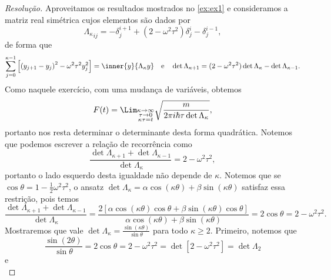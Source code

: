 \begin{proof}[Resolução]
   Aproveitamos os resultados mostrados no \cref{ex:ex1} e consideramos a matriz real simétrica cujos elementos são dados por
   \begin{equation*}
      {\Lambda_{\kappa}}_{ij} = -\delta^{i+1}_j + (2 - \omega^2 \tau^2) \delta^{i}_j - \delta^{i -1}_j,
   \end{equation*}
   de forma que
   \begin{equation*}
      \sum_{j = 0}^{\kappa - 1} \left[\left(y_{j+1} - y_j\right)^2 - \omega^2\tau^2 y_j^2\right] = \inner{y}{\Lambda_{\kappa} y}
      \quad\text{e}\quad
      \det{\Lambda_{\kappa + 1}} = (2 - \omega^2 \tau^2) \det{\Lambda_{\kappa}} - \det{\Lambda_{\kappa - 1}}.
   \end{equation*}
   Como naquele exercício, com uma mudança de variáveis, obtemos
   \begin{equation*}
      F(t) = \Lim_{\substack{\kappa \to \infty\\ \tau \to 0\\ \kappa \tau = t}}{\sqrt{\frac{m}{2\pi i \hbar \tau \det \Lambda_{\kappa}}}},
   \end{equation*}
   portanto nos resta determinar o determinante desta forma quadrática. Notemos que podemos escrever a relação de recorrência como
   \begin{equation*}
      \frac{\det{\Lambda_{\kappa+1}} + \det{\Lambda_{\kappa - 1}}}{\det{\Lambda_{\kappa}}} = 2 - \omega^2 \tau^2,
   \end{equation*}
   portanto o lado esquerdo desta igualdade não depende de \(\kappa.\) Notemos que se \(\cos\theta = 1 - \frac12 \omega^2 \tau^2\), o ansatz \(\det{\Lambda_{\kappa}} = \alpha \cos(\kappa \theta) + \beta \sin(\kappa \theta)\) satisfaz essa restrição, pois temos
   \begin{equation*}
      \frac{\det{\Lambda_{\kappa+1}} + \det{\Lambda_{\kappa - 1}}}{\det{\Lambda_{\kappa}}} = \frac{2\left[\alpha \cos(\kappa \theta) \cos\theta + \beta \sin(\kappa \theta) \cos \theta\right]}{\alpha \cos(\kappa \theta) + \beta \sin (\kappa \theta)} = 2 \cos\theta = 2 - \omega^2 \tau^2.
   \end{equation*}
   Mostraremos que vale \(\det\Lambda_{\kappa} = \frac{\sin(\kappa \theta)}{\sin\theta}\) para todo \(\kappa \geq 2.\) Primeiro, notemos que
   \begin{equation*}
      \frac{\sin(2 \theta)}{\sin\theta} = 2\cos\theta = 2 - \omega^2 \tau^2 = \det[2 - \omega^2 \tau^2] = \det{\Lambda_{2}}
   \end{equation*}
   e
   \begin{equation*}

\end{equation*}
\end{proof}
